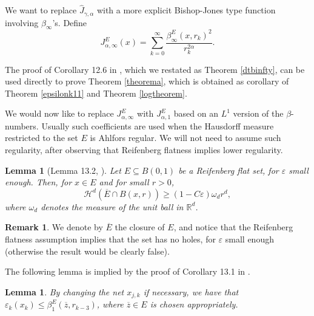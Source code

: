 \documentclass[11pt, twoside, leqno]{article}
\numberwithin{equation}{section}
\theoremstyle{plain}
\newtheorem{lem}[thm]{Lemma}
\theoremstyle{definition}
\newtheorem{rk}[thm]{Remark}
\newcommand{\R}{\mathbb{R}}
\newcommand{\e}{\varepsilon} %
\newcommand{\dist}{\operatorname{dist}}
\begin{document}
We want to replace $\hat{J}_{\gamma,\alpha}$ with a more explicit Bishop-Jones type function involving $\beta_{\infty}$'s. Define
\begin{equation}
J^E_{\alpha, \infty}(x)=\sum_{k=0}^{\infty}\frac{\beta^E_{\infty}(x,r_k)^2}{r_k^{2\alpha}}.
\end{equation}

The proof of Corollary 12.6 in \cite{davidtoro}, which we restated as Theorem \ref{dtbinfty}, can be used directly to prove Theorem \ref{theorema}, which is obtained as corollary of Theorem \ref{epsilonk11} and Theorem \ref{logtheorem}.


We would now like to replace $J^E_{\alpha, \infty}$ with $J^E_{\alpha,1}$ based on an $L^1$ version of the $\beta$-numbers. Usually such coefficients are used when the Hausdorff measure restricted to the set $E$ is Ahlfors regular. We will not need to assume such regularity, after observing that Reifenberg flatness implies lower regularity. 


\begin{lem} [Lemma 13.2, \cite{davidtoro}]
Let $E \subseteq B(0,1)$ be a Reifenberg flat set, for $\e$ small enough. Then, for $x \in E$ and for small $r>0$,
\begin{equation}
\mathcal{H}^d(\overline{E}\cap B(x,r)) \geq (1-C\e)\omega_d r^d,
\end{equation}
where $\omega_d$ denotes the measure of the unit ball in $\R^d$.
\end{lem}
\begin{rk}
We denote by $\overline{E}$ the closure of $E$, and notice that the Reifenberg flatness assumption implies that the set has no holes, for $\e$ small enough (otherwise the result would be clearly false). 
\end{rk}


The following lemma is implied by the proof of Corollary 13.1 in \cite{davidtoro}.
\begin{lem}
By changing the net $x_{j,k}$ if necessary, we have that $ \e_k
(x_k) \leq \beta^E_1(\overline{z}, r_{k-3})$, where $\overline{z} \in E$ is chosen appropriately.
\end{lem}
\end{document}
